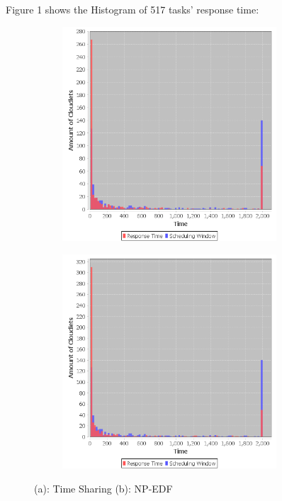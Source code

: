 \documentclass[twocolumn]{article}
\begin{document}
Figure 1 shows the Histogram of 517 tasks' response time:\\
\begin{figure}[htp]
\centering
\begin{subfigure}{0.5\textwidth}
	\centering
	\includegraphics[width=8cm]{timesharedtaskHistogram}
	\caption{}
\end{subfigure}%
\begin{subfigure}{0.5\textwidth}
	\centering
	\includegraphics[width=8cm]{npedftaskHistogram}
	\caption{}
\end{subfigure}
\caption{(a): Time Sharing (b): NP-EDF}
\label{fig:taskhistogram}
\end{figure}
\end{document}
